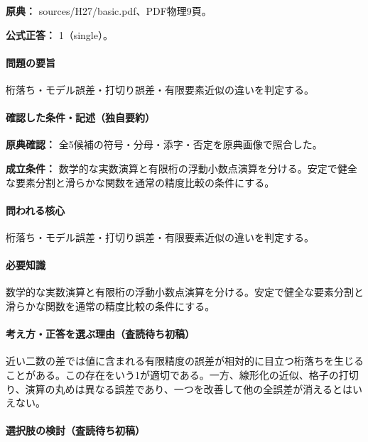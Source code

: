 \noindent\textbf{原典：} sources/H27/basic.pdf、PDF物理9頁。

\textbf{公式正答：} 1（single）。

\paragraph{問題の要旨} 桁落ち・モデル誤差・打切り誤差・有限要素近似の違いを判定する。

\paragraph{確認した条件・記述（独自要約）}\mbox{}\par

\noindent\textbf{原典確認：} 全5候補の符号・分母・添字・否定を原典画像で照合した。\par

\noindent\textbf{成立条件：} 数学的な実数演算と有限桁の浮動小数点演算を分ける。安定で健全な要素分割と滑らかな関数を通常の精度比較の条件にする。\par

\paragraph{問われる核心} 桁落ち・モデル誤差・打切り誤差・有限要素近似の違いを判定する。

\paragraph{必要知識} 数学的な実数演算と有限桁の浮動小数点演算を分ける。安定で健全な要素分割と滑らかな関数を通常の精度比較の条件にする。

\paragraph{考え方・正答を選ぶ理由（査読待ち初稿）} 近い二数の差では値に含まれる有限精度の誤差が相対的に目立つ桁落ちを生じることがある。この存在をいう1が適切である。一方、線形化の近似、格子の打切り、演算の丸めは異なる誤差であり、一つを改善して他の全誤差が消えるとはいえない。

\paragraph{選択肢の検討（査読待ち初稿）}\mbox{}\par

